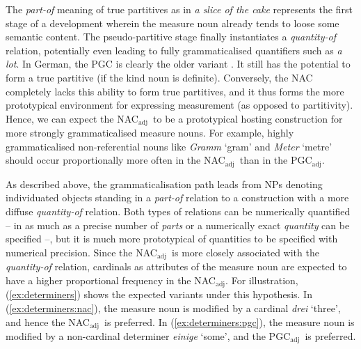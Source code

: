 \documentclass[USenglish]{article}
\newcommand{\Sub}[1]{\ensuremath{\mathrm{_{#1}}}}
\newcommand{\NACa}{NAC\Sub{adj}}
\newcommand{\PGCa}{PGC\Sub{adj}}
\begin{document}
The \textit{part-of} meaning of true partitives as in \textit{a slice of the cake} represents the first stage of a development wherein the measure noun already tends to loose some semantic content.
The pseudo-partitive stage finally instantiates a \textit{quantity-of} relation, potentially even leading to fully grammaticalised quantifiers such as \textit{a lot}.
In German, the PGC is clearly the older variant \citep{Zimmer2015}.
It still has the potential to form a true partitive (if the kind noun is definite).
Conversely, the NAC completely lacks this ability to form true partitives, and it thus forms the more prototypical environment for expressing measurement (as opposed to partitivity).
Hence, we can expect the \NACa\ to be a prototypical hosting construction for more strongly grammaticalised measure nouns.
For example, highly grammaticalised non-referential nouns like \textit{Gramm} `gram' and \textit{Meter} `metre' should occur proportionally more often in the \NACa\ than in the \PGCa.


As described above, the grammaticalisation path leads from NPs denoting individuated objects standing in a \textit{part-of} relation to a construction with a more diffuse \textit{quantity-of} relation.
Both types of relations can be numerically quantified -- in as much as a precise number of \textit{parts} or a numerically exact \textit{quantity} can be specified --, but it is much more prototypical of quantities to be specified with numerical precision.
Since the \NACa\ is more closely associated with the \textit{quantity-of} relation, cardinals as attributes of the measure noun are expected to have a higher proportional frequency in the \NACa.
For illustration, (\ref{ex:determiners}) shows the expected variants under this hypothesis.
In (\ref{ex:determiners:nac}), the measure noun is modified by a cardinal \textit{drei} `three', and hence the \NACa\ is preferred.
In (\ref{ex:determiners:pgc}), the measure noun is modified by a non-cardinal determiner \textit{einige} `some', and the \PGCa\ is preferred.
\end{document}
